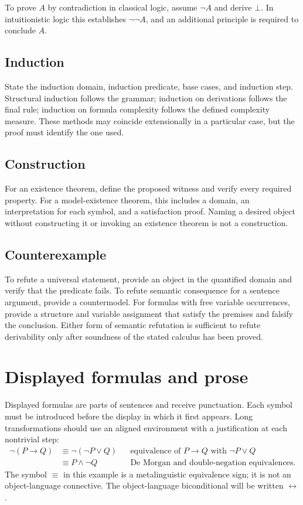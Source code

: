 \documentclass[11pt,oneside,openany]{book}
\theoremstyle{definition}
\theoremstyle{plain}
\theoremstyle{remark}
\newcommand{\bottom}{\bot}
\begin{document}
To prove \(A\) by contradiction in classical logic, assume \(\neg A\) and
derive \(\bottom\).  In intuitionistic logic this establishes
\(\neg\neg A\), and an additional principle is required to conclude \(A\).

\subsection{Induction}

State the induction domain, induction predicate, base cases, and induction
step.  Structural induction follows the grammar; induction on derivations
follows the final rule; induction on formula complexity follows the defined
complexity measure.  These methods may coincide extensionally in a particular
case, but the proof must identify the one used.

\subsection{Construction}

For an existence theorem, define the proposed witness and verify every required
property.  For a model-existence theorem, this includes a domain, an
interpretation for each symbol, and a satisfaction proof.  Naming a desired
object without constructing it or invoking an existence theorem is not a
construction.

\subsection{Counterexample}

To refute a universal statement, provide an object in the quantified domain and
verify that the predicate fails.  To refute semantic consequence for a
sentence argument, provide a countermodel.  For formulas with free variable
occurrences, provide a structure and variable assignment that satisfy the
premises and falsify the conclusion.  Either form of semantic refutation is
sufficient to refute derivability only after soundness of the stated calculus
has been proved.

\section{Displayed formulas and prose}
\label{sec:writing-foundations-05}

Displayed formulas are parts of sentences and receive punctuation.  Each
symbol must be introduced before the display in which it first appears.
Long transformations should use an aligned environment with a justification at
each nontrivial step:
\[
\begin{aligned}
  \neg(P\to Q)
    &\equiv \neg(\neg P\lor Q) && \text{equivalence of }P\to Q
    \text{ with }\neg P\lor Q\\
    &\equiv P\land\neg Q       && \text{De Morgan and double-negation
    equivalences}.
\end{aligned}
\]
The symbol \(\equiv\) in this example is a metalinguistic equivalence sign; it
is not an object-language connective.  The object-language biconditional will
be written \(\leftrightarrow\).
\end{document}
